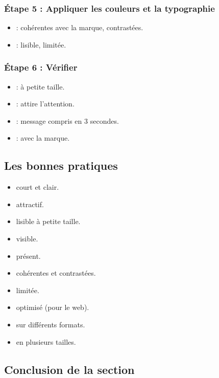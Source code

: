 \subsubsection{Étape 5 : Appliquer les couleurs et la typographie}

\begin{itemize}
    \item {} : cohérentes avec la marque, contrastées.
    \item {} : lisible, limitée.
\end{itemize}

\subsubsection{Étape 6 : Vérifier}

\begin{itemize}
    \item {} : à petite taille.
    \item {} : attire l'attention.
    \item {} : message compris en 3 secondes.
    \item {} : avec la marque.
\end{itemize}

\subsection{Les bonnes pratiques}

\begin{itemize}
    \item {} court et clair.
    \item {} attractif.
    \item {} lisible à petite taille.
    \item {} visible.
    \item {} présent.
    \item {} cohérentes et contrastées.
    \item {} limitée.
    \item {} optimisé (pour le web).
    \item {} sur différents formats.
    \item {} en plusieurs tailles.
\end{itemize}

\subsection*{Conclusion de la section}

